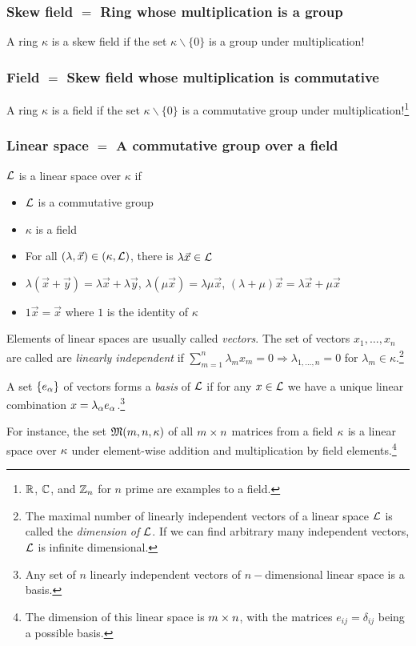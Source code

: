 \subsubsection{Skew field $=$ Ring whose multiplication is a group}
A ring $\kappa$ is a skew field if the set $\kappa\backslash \{0\}$ is a group under multiplication!
\subsubsection{Field $=$ Skew field whose multiplication is commutative}
A ring $\kappa$ is a field if the set $\kappa\backslash \{0\}$ is a commutative group under multiplication!\footnote{$\mathbb{R}$, $\mathbb{C}$, and $\mathbb{Z}_n$ for $n$ prime are examples to a field.}
	
\subsubsection{Linear space $=$ A commutative group over a field}
$\mathcal{L}$ is a linear space over $\kappa$ if
\begin{itemize}
	\item  $\mathcal{L}$ is a commutative group
	\item $\kappa$ is a field
	\item For all $(\lambda,\vec{x})\in (\kappa,\mathcal{L})$, there is $\lambda \vec{x}\in \mathcal{L}$
	\item $\lambda(\vec{x}+\vec{y})=\lambda \vec{x}+\lambda \vec{y}$,\; $\lambda (\mu \vec{x})=\lambda \mu \vec{x}$,\; $(\lambda+\mu)\vec{x}=\lambda \vec{x}+\mu \vec{x}$
	\item $1\vec{x}=\vec{x}$ where $1$ is the identity of $\kappa$
\end{itemize}
Elements of linear spaces are usually called \emph{vectors}. The set of vectors $x_1,\dots,x_n$ are called are \emph{linearly independent} if $\sum\limits_{m=1}^{n}\lambda_mx_m=0 \Rightarrow \lambda_{1,\dots,n}=0$ for $\lambda_m\in \kappa$.\footnote{
The maximal number of linearly independent vectors of a linear space $\mathcal{L}$ is called the \emph{dimension of $\mathcal{L}$}. If we can find arbitrary many independent vectors, $\mathcal{L}$ is infinite dimensional.
}

A set $\{e_\alpha\}$ of vectors forms a \emph{basis} of $\mathcal{L}$ if for any $x\in \mathcal{L}$ we have a unique linear combination $x=\lambda_\alpha e_\alpha$.\footnote{Any set of $n$ linearly independent vectors of $n-$dimensional linear space is a basis.}

For instance, the set $\mathfrak{M}(m,n,\kappa)$ of all $m\times n$ matrices from a field $\kappa$ is a linear space over $\kappa$ under element-wise addition and multiplication by field elements.\footnote{The dimension of this linear space is $m\times n$, with the matrices $e_{ij}=\delta_{ij}$ being a possible basis.}
